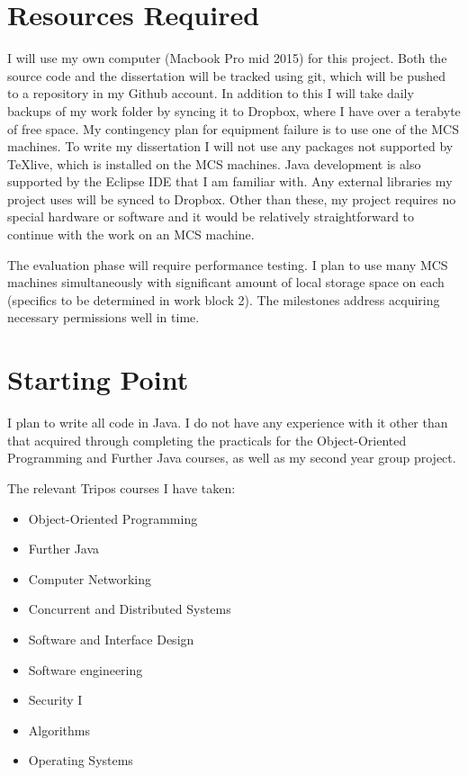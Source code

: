 \documentclass[12pt]{article}
\begin{document}
\section{Resources Required}

I will use my own computer (Macbook Pro mid 2015) for this project. Both the source code and the dissertation will be tracked using git, which will be pushed to a repository in my Github account. In addition to this I will take daily backups of my work folder by syncing it to Dropbox, where I have over a terabyte of free space. My contingency plan for equipment failure is to use one of the MCS machines. To write my dissertation I will not use any packages not supported by \TeX live, which is installed on the MCS machines. Java development is also supported by the Eclipse IDE that I am familiar with. Any external libraries my project uses will be synced to Dropbox. Other than these, my project requires no special hardware or software and it would be relatively straightforward to continue with the work on an MCS machine.

The evaluation phase will require performance testing. I plan to use many MCS machines simultaneously with significant amount of local storage space on each (specifics to be determined in work block 2). The milestones address acquiring necessary permissions well in time.

\section{Starting Point}

I plan to write all code in Java. I do not have any experience with it other than that acquired through completing the practicals for the Object-Oriented Programming and Further Java courses, as well as my second year group project.

The relevant Tripos courses I have taken:
\begin{itemize}
\item{Object-Oriented Programming}
\item{Further Java}
\item{Computer Networking}
\item{Concurrent and Distributed Systems}
\item{Software and Interface Design}
\item{Software engineering}
\item{Security I}
\item{Algorithms}
\item{Operating Systems}
\end{itemize}
\end{document}
